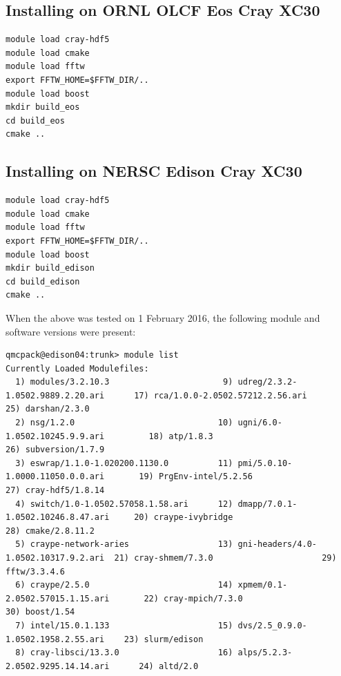 \subsection{Installing on ORNL OLCF Eos Cray XC30}
\begin{verbatim}
module load cray-hdf5
module load cmake
module load fftw
export FFTW_HOME=$FFTW_DIR/..
module load boost
mkdir build_eos
cd build_eos
cmake ..
\end{verbatim}

\subsection{Installing on NERSC Edison Cray XC30}

\begin{verbatim}
module load cray-hdf5
module load cmake
module load fftw
export FFTW_HOME=$FFTW_DIR/..
module load boost
mkdir build_edison
cd build_edison
cmake ..
\end{verbatim}
When the above was tested on 1 February 2016, the following module and
software versions were present:
\begin{verbatim}
qmcpack@edison04:trunk> module list
Currently Loaded Modulefiles:
  1) modules/3.2.10.3                       9) udreg/2.3.2-1.0502.9889.2.20.ari      17) rca/1.0.0-2.0502.57212.2.56.ari       25) darshan/2.3.0
  2) nsg/1.2.0                             10) ugni/6.0-1.0502.10245.9.9.ari         18) atp/1.8.3                             26) subversion/1.7.9
  3) eswrap/1.1.0-1.020200.1130.0          11) pmi/5.0.10-1.0000.11050.0.0.ari       19) PrgEnv-intel/5.2.56                   27) cray-hdf5/1.8.14
  4) switch/1.0-1.0502.57058.1.58.ari      12) dmapp/7.0.1-1.0502.10246.8.47.ari     20) craype-ivybridge                      28) cmake/2.8.11.2
  5) craype-network-aries                  13) gni-headers/4.0-1.0502.10317.9.2.ari  21) cray-shmem/7.3.0                      29) fftw/3.3.4.6
  6) craype/2.5.0                          14) xpmem/0.1-2.0502.57015.1.15.ari       22) cray-mpich/7.3.0                      30) boost/1.54
  7) intel/15.0.1.133                      15) dvs/2.5_0.9.0-1.0502.1958.2.55.ari    23) slurm/edison
  8) cray-libsci/13.3.0                    16) alps/5.2.3-2.0502.9295.14.14.ari      24) altd/2.0
\end{verbatim}


